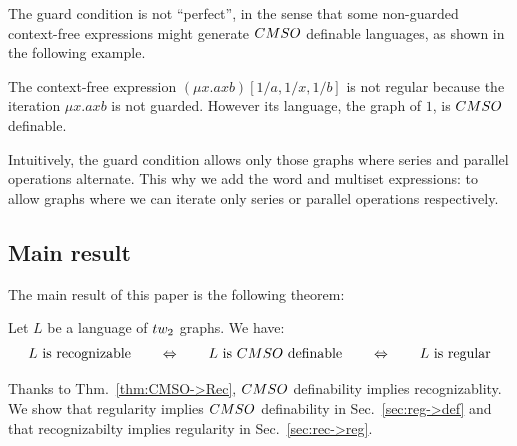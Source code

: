 The guard condition is not ``perfect'', in the sense that some non-guarded context-free expressions might  generate $\CMSO$ definable languages, as shown in   the following example.

\begin{example}
 The context-free expression $(\mu x. axb)[1/a, 1/x, 1/b]$ is not regular because the iteration $\mu x. axb$ is not guarded. However its language, the  graph of $1$,   is $\CMSO$ definable.
\end{example}

\begin{remark}
Intuitively, the guard condition allows only those graphs where series and parallel operations alternate. This why we add the word and multiset expressions: to allow graphs where we can iterate only series or parallel operations respectively.
\end{remark}

\subsection{Main result}

The main result of this paper is the following theorem:
\begin{theorem}
Let $L$ be a language of $\TWT$ graphs. We have:
$$L \text{ is recognizable}\qquad \Leftrightarrow \qquad L \text{ is $\CMSO$ definable}  \qquad \Leftrightarrow \qquad L \text{ is regular}$$
\end{theorem}
Thanks to Thm.~\ref{thm:CMSO->Rec}, $\CMSO$ definability implies recognizablity. We show that regularity implies $\CMSO$ definability in Sec.~\ref{sec:reg->def} and  that recognizabilty implies regularity in Sec.~\ref{sec:rec->reg}. 